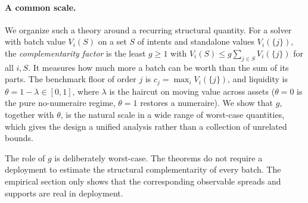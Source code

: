 \documentclass{llncs}
\begin{document}
\paragraph{A common scale.}
We organize such a theory around a recurring structural quantity. For a
solver with batch value $V_i(S)$ on a set $S$ of intents and standalone
values $V_i(\{j\})$, the \emph{complementarity factor} is the least
$g\ge1$ with $V_i(S)\le g\sum_{j\in S}V_i(\{j\})$ for all $i,S$. It measures how much
more a batch can be worth than the sum of its parts. The benchmark floor
of order $j$ is $c_j=\max_i V_i(\{j\})$, and liquidity is
$\theta=1-\lambda\in[0,1]$, where $\lambda$ is the haircut on moving
value across assets ($\theta=0$ is the pure no-numeraire regime,
$\theta=1$ restores a numeraire). We show that $g$, together with
$\theta$, is the natural scale in a wide range of worst-case quantities,
which gives the design a unified analysis rather than a collection of
unrelated bounds.

The role of $g$ is deliberately worst-case. The theorems do not require a
deployment to estimate the structural complementarity of every batch.
The empirical section only shows that the corresponding observable
spreads and supports are real in deployment.
\end{document}
